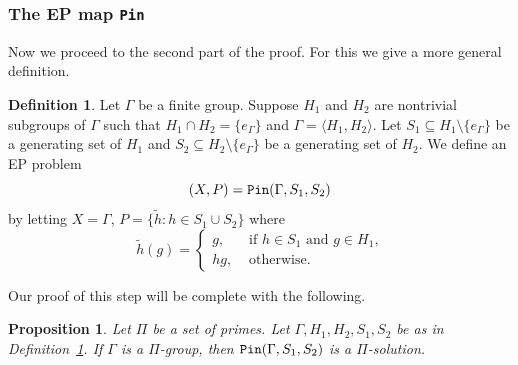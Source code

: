 \documentclass[11pt]{amsart}
\newtheorem{proposition}[theorem]{Proposition}
\theoremstyle{definition}
\newtheorem{definition}[theorem]{Definition}
\theoremstyle{definition}
\numberwithin{equation}{section}
\begin{document}
\subsubsection{The EP map {\tt Pin}}

Now we proceed to the second part of the proof. For this we give a more general definition.

\begin{definition} \label{def:Pin} Let $\Gamma$ be a finite group. Suppose $H_1$ and $H_2$ are nontrivial subgroups of $\Gamma$ such that
$H_1\cap H_2=\{e_\Gamma\}$ and $\Gamma=\langle H_1, H_2\rangle$. Let $S_1\subseteq H_1\setminus \{e_\Gamma\}$ be a generating set of $H_1$ and $S_2\subseteq H_2\setminus\{e_\Gamma\}$ be a generating set of $H_2$. We define an EP problem
$$ (X, P)={\tt Pin} (\Gamma, S_1, S_2) $$
by letting $X=\Gamma$, $P=\big\{ \tilde{h}\colon h\in S_1\cup S_2\big\}$ where
$$ \tilde{h}(g)=\left\{\begin{array}{ll} g, & \mbox{ if $h\in S_1$ and $g\in H_1$,} \\
hg, & \mbox{ otherwise.}
\end{array}\right.
$$
\end{definition}

Our proof of this step will be complete with the following.

\begin{proposition} Let $\Pi$ be a set of primes. Let $\Gamma, H_1, H_2, S_1, S_2$ be as in Definition~\ref{def:Pin}. If $\Gamma$ is a $\Pi$-group, then $\mbox{\tt Pin}(\Gamma, S_1, S_2)$ is a $\Pi$-solution.
\end{proposition}
\end{document}
